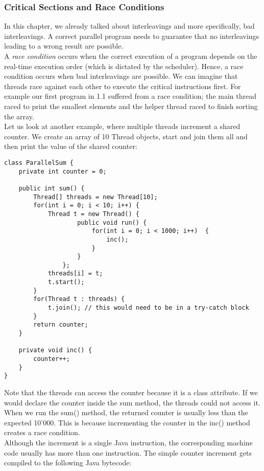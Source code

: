 \documentclass[main.tex]{subfiles}
\begin{document}
\subsubsection{Critical Sections and Race Conditions}
In this chapter, we already talked about interleavings and more specifically, bad interleavings. A correct parallel program needs to guarantee that no interleavings leading to a wrong result are possible.\\[3mm]
A \textit{race condition} occurs when the correct execution of a program depends on the real-time execution order (which is dictated by the scheduler). Hence, a race condition occurs when bad interleavings are possible. We can imagine that threads race against each other to execute the critical instructions first. For example our first program in 1.1 suffered from a race condition; the main thread raced to print the smallest elements and the helper thread raced to finish sorting the array.\\[3mm]
Let us look at another example, where multiple threads increment a shared counter. We create an array of 10 Thread objects, start and join them all and then print the value of the shared counter:
\begin{verbatim}
class ParallelSum {
    private int counter = 0;

    public int sum() {
        Thread[] threads = new Thread[10];
        for(int i = 0; i < 10; i++) {
            Thread t = new Thread() {
                    public void run() {
                        for(int i = 0; i < 1000; i++)  {
                            inc();
                        }
                    }
                };
            threads[i] = t;
            t.start();
        }
        for(Thread t : threads) {
            t.join(); // this would need to be in a try-catch block
        }
        return counter;
    }

    private void inc() {
        counter++;
    }
}
\end{verbatim}
Note that the threads can access the counter because it is a class attribute. If we would declare the counter inside the sum method, the threads could not access it.\\
When we run the sum() method, the returned counter is usually less than the expected 10'000. This is because incrementing the counter in the inc() method creates a race condition.\\[3mm]
Although the increment is a single Java instruction, the corresponding machine code usually has more than one instruction. The simple counter increment gets compiled to the following Java bytecode:
\end{document}
